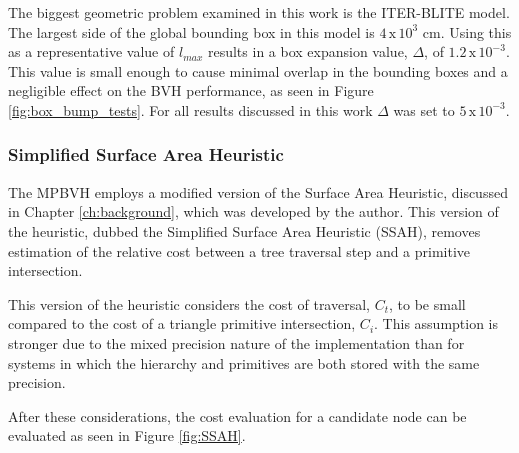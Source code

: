 The biggest geometric problem examined in this work is the ITER-BLITE model. The
largest side of the global bounding box in this model is $4 \, \text{x} \,
10^{3}$ cm. Using this as a representative value of $l_{max}$ results in a box
expansion value, $\Delta$, of $1.2 \, \text{x} \, 10^{-3}$. This value is small
enough to cause minimal overlap in the bounding boxes and a negligible effect on
the BVH performance, as seen in Figure \ref{fig:box_bump_tests}. For all results
discussed in this work $\Delta$ was set to $5 \, \text{x} \, 10 ^{-3}$.

\subsubsection{Simplified Surface Area Heuristic}

The MPBVH employs a modified version of the Surface Area Heuristic,
discussed in Chapter \ref{ch:background}, which was developed by the
author. This version of the heuristic, dubbed the Simplified Surface Area
Heuristic (SSAH), removes estimation of the relative cost between a tree
traversal step and a primitive intersection.

This version of the heuristic considers the cost of traversal, $C_{t}$, to be
small compared to the cost of a triangle primitive intersection, $C_{i}$. This
assumption is stronger due to the mixed precision nature of the implementation
than for systems in which the hierarchy and primitives are both stored with the
same precision.

After these considerations, the cost evaluation for a candidate node can be
evaluated as seen in Figure \ref{fig:SSAH}.

